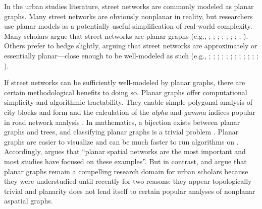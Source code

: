 \documentclass[Afour,sageh,times]{sagej}
\begin{document}
In the urban studies literature, street networks are commonly modeled as planar graphs. Many street networks are obviously nonplanar in reality, but researchers use planar models as a potentially useful simplification of real-world complexity. Many scholars argue that street networks are planar graphs (e.g., \citealp[p.~18]{batty_network_2005}; \citealp[p.~521]{buhl_topological_2006}; \citealp[p.~1]{hu_topological_2008}; \citealp[p.~259]{masucci_random_2009}; \citealp[p.~114]{porta_networks_2010}; \citealp[p.~3]{strano_elementary_2012}; \citealp[p.~1]{masucci_limited_2013}; \citealp[p.~1074]{strano_urban_2013}; \citealp[p.~168]{law_defining_2017}). Others prefer to hedge slightly, arguing that street networks are approximately or essentially planar---close enough to be well-modeled as such (e.g., \citealp[p.~6]{dill_measuring_2004}; \citealp[p.~3]{cardillo_structural_2006};  \citealp[p.~340]{xie_measuring_2007}; \citealp[p.~1]{barthelemy_modeling_2008}; \citealp[p.~3]{barthelemy_spatial_2011}; \citealp[pp.~563]{chan_urban_2011}; \citealp[p.~1]{gudmundsson_entropy_2013}; \citealp[p.~1]{viana_simplicity_2013}; \citealp[p.~2]{louf_typology_2014}; \citealp[p.~2191]{zhong_detecting_2014}; \citealp[p.~2]{wang_resilience_2015}; \citealp[p.~42]{aldous_routed_2016}; \citealp[p.~257]{barthelemy_paths_2017}).

If street networks can be sufficiently well-modeled by planar graphs, there are certain methodological benefits to doing so. Planar graphs offer computational simplicity and algorithmic tractability. They enable simple polygonal analysis of city blocks and form \citep{fohl_non-planar_1996,barthelemy_paths_2017} and the calculation of the \emph{alpha} and \emph{gamma} indices popular in road network analysis \citep{eppstein_studying_2008}. In mathematics, a bijection exists between planar graphs and trees, and classifying planar graphs is a trivial problem \citep{louf_typology_2014}. Planar graphs are easier to visualize and can be much faster to run algorithms on \citep{liebers_planarizing_2001}. Accordingly, \citet[p.~3]{barthelemy_spatial_2011} argues that \enquote{planar spatial networks are the most important and most studies have focused on these examples}. But in contrast, \citet{masucci_random_2009} and \citet{masucci_limited_2013} argue that planar graphs remain a compelling research domain for urban scholars because they were understudied until recently for two reasons: they appear topologically trivial and planarity does not lend itself to certain popular analyses of nonplanar aspatial graphs.
\end{document}
